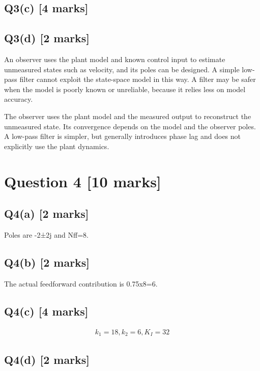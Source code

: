 \documentclass[11pt,a4paper]{article}
\begin{document}
\subsection*{Q3(c) \hfill [4 marks]}

\vspace{2mm}

\subsection*{Q3(d) \hfill [2 marks]}

An observer uses the plant model and known control input to estimate unmeasured states such as velocity, and its poles can be designed.
A simple low-pass filter cannot exploit the state-space model in this way.
A filter may be safer when the model is poorly known or unreliable, because it relies less on model accuracy.\par\smallskip The observer uses the plant model and the measured output to reconstruct the unmeasured state. Its convergence depends on the model and the observer poles. A low-pass filter is simpler, but generally introduces phase lag and does not explicitly use the plant dynamics.

\section*{Question 4 \hfill [10 marks]}
\subsection*{Q4(a) \hfill [2 marks]}

Poles are -2±2j and Nff=8.

\subsection*{Q4(b) \hfill [2 marks]}

The actual feedforward contribution is 0.75x8=6.

\subsection*{Q4(c) \hfill [4 marks]}

\[\begin{aligned}k_1=18, k_2=6, K_I=32\end{aligned}\]

\subsection*{Q4(d) \hfill [2 marks]}
\end{document}
